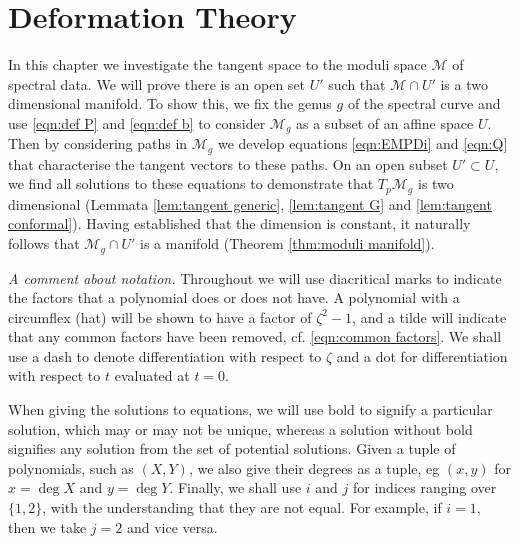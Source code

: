 
\chapter{Deformation Theory}
\label{chp:Deformation Theory}

In this chapter we investigate the tangent space to the moduli space $\mathcal{M}$ of spectral data. We will prove there is an open set $U'$ such that $\mathcal{M}\cap U'$ is a two dimensional manifold. To show this, we fix the genus $g$ of the spectral curve and use \eqref{eqn:def P} and \eqref{eqn:def b} to consider $\mathcal{M}_g$ as a subset of an affine space $U$. Then by considering paths in $\mathcal{M}_g$ we develop equations \eqref{eqn:EMPDi} and \eqref{eqn:Q} that characterise the tangent vectors to these paths. On an open subset $U' \subset U$, we find all solutions to these equations to demonstrate that $T_p\mathcal{M}_g$ is two dimensional (Lemmata \ref{lem:tangent generic}, \ref{lem:tangent G} and \ref{lem:tangent conformal}). Having established that the dimension is constant, it naturally follows that $\mathcal{M}_g\cap U'$ is a manifold (Theorem \ref{thm:moduli manifold}).

\emph{A comment about notation.} Throughout we will use diacritical marks to indicate the factors that a polynomial does or does not have. A polynomial with a circumflex (hat) will be shown to have a factor of $ζ^2-1$, and a tilde will indicate that any common factors have been removed, cf. \eqref{eqn:common factors}. We shall use a dash to denote differentiation with respect to $ζ$ and a dot for differentiation with respect to $t$ evaluated at $t=0$.

When giving the solutions to equations, we will use bold to signify a particular solution, which may or may not be unique, whereas a solution without bold signifies any solution from the set of potential solutions. Given a tuple of polynomials, such as $(X,Y)$, we also give their degrees as a tuple, eg $(x,y)$ for $x=\deg X$ and $y=\deg Y$. Finally, we shall use $i$ and $j$ for indices ranging over $\{1,2\}$, with the understanding that they are not equal. For example, if $i=1$, then we take $j=2$ and vice versa.

